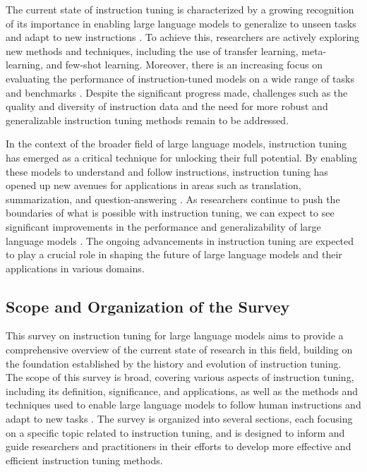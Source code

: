 \documentclass[11pt]{article}
\begin{document}
The current state of instruction tuning is characterized by a growing recognition of its importance in enabling large language models to generalize to unseen tasks and adapt to new instructions \cite{ref19}. To achieve this, researchers are actively exploring new methods and techniques, including the use of transfer learning, meta-learning, and few-shot learning. Moreover, there is an increasing focus on evaluating the performance of instruction-tuned models on a wide range of tasks and benchmarks \cite{ref20}. Despite the significant progress made, challenges such as the quality and diversity of instruction data \cite{ref21} and the need for more robust and generalizable instruction tuning methods \cite{ref22} remain to be addressed.

In the context of the broader field of large language models, instruction tuning has emerged as a critical technique for unlocking their full potential. By enabling these models to understand and follow instructions, instruction tuning has opened up new avenues for applications in areas such as translation, summarization, and question-answering \cite{ref4}. As researchers continue to push the boundaries of what is possible with instruction tuning, we can expect to see significant improvements in the performance and generalizability of large language models \cite{ref23}. The ongoing advancements in instruction tuning are expected to play a crucial role in shaping the future of large language models and their applications in various domains.

\subsection{Scope and Organization of the Survey}

This survey on instruction tuning for large language models aims to provide a comprehensive overview of the current state of research in this field, building on the foundation established by the history and evolution of instruction tuning. The scope of this survey is broad, covering various aspects of instruction tuning, including its definition, significance, and applications, as well as the methods and techniques used to enable large language models to follow human instructions and adapt to new tasks \cite{ref12}. The survey is organized into several sections, each focusing on a specific topic related to instruction tuning, and is designed to inform and guide researchers and practitioners in their efforts to develop more effective and efficient instruction tuning methods.
\end{document}
